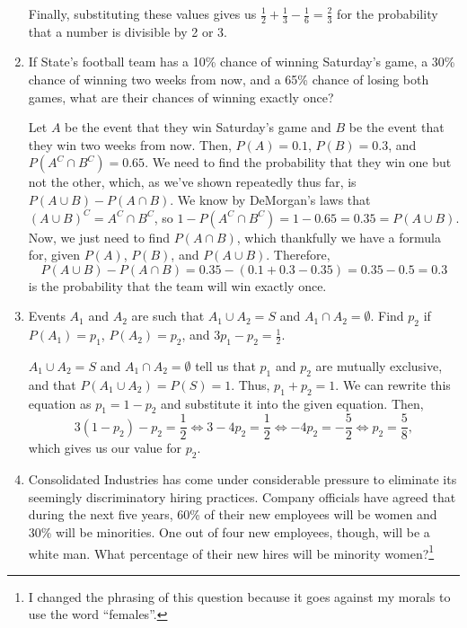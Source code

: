 \documentclass{article}
\begin{document}
\begin{enumerate}
\begin{solution}
        Finally, substituting these values gives us \(
            \frac{1}{2} + \frac{1}{3} - \frac{1}{6} = \frac{2}{3}
        \) for the probability that a number is divisible by 2 or 3. 
    \end{solution}
    \item If State's football team has a 10\% chance of winning Saturday's game, a 30\% chance of winning two weeks from now, and a 65\% chance of losing both games, what
    are their chances of winning exactly once?\begin{solution}
        Let \(A\) be the event that they win Saturday's game and \(B\) be the event that they win two weeks from now. Then, \(P(A) = 0.1\), \(P(B) = 0.3\), and \(P(A^C\cap{}B^C) = 0.65\).
        We need to find the probability that they win one but not the other, which, as we've shown repeatedly thus far, is \(P(A\cup{}B) - P(A\cap{}B)\). We know by DeMorgan's laws that 
        \({(A\cup{}B)}^C = A^C\cap{}B^C\), so \(1-P(A^C\cap{}B^C) = 1-0.65 = 0.35 = P(A\cup{}B)\). Now, we just need to find \(P(A\cap{}B)\), which thankfully we have a formula for, given 
        \(P(A)\), \(P(B)\), and \(P(A\cup{}B)\). Therefore,\[
            P(A\cup{}B) - P(A\cap{}B) = 0.35 - (0.1 + 0.3 - 0.35) = 0.35 - 0.5 = 0.3 
        \] is the probability that the team will win exactly once. 
    \end{solution}
    \item Events \(A_1\) and \(A_2\) are such that \(A_1 \cup{} A_2 = S\) and \(A_1 \cap A_2 = \emptyset\). Find \(p_2\) if \(P(A_1) = p_1\), \(P(A_2) = p_2\), and
    \(3p_1 - p_2 = \frac{1}{2}\).\begin{solution}
        \(A_1 \cup{} A_2 = S\) and \(A_1 \cap A_2 = \emptyset\) tell us that \(p_1\) and \(p_2\) are mutually exclusive, and that \(P(A_1\cup{}A_2) = P(S) = 1\). Thus, \(p_1 + p_2 = 1\). 
        We can rewrite this equation as \(p_1 = 1 - p_2\) and substitute it into the given equation. Then,\[
            3(1-p_2) - p_2 = \frac{1}{2} \Longleftrightarrow
            3 - 4p_2 = \frac{1}{2} \Longleftrightarrow
            -4p_2 = -\frac{5}{2} \Longleftrightarrow
            p_2 = \frac{5}{8},
        \] which gives us our value for \(p_2\). 
    \end{solution}
    \item Consolidated Industries has come under considerable pressure to eliminate its seemingly discriminatory hiring practices. Company officials have agreed that during
    the next five years, 60\% of their new employees will be women and 30\% will be minorities. One out of four new employees, though, will be a white man. What percentage
    of their new hires will be minority women?\footnote{I changed the phrasing of this question because it goes against my morals to use the word ``females''.}\begin{solution}
        
    \end{solution}
\end{enumerate}
\end{document}

